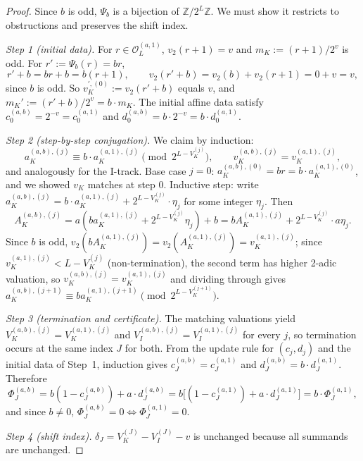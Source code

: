 \documentclass[11pt,reqno]{amsart}
\theoremstyle{plain}
\theoremstyle{definition}
\theoremstyle{remark}
\newcommand{\Z}{\mathbb{Z}}
\newcommand{\Obs}{\mathcal{O}}
\newcommand{\Vk}{V_{K}}
\newcommand{\Vi}{V_{I}}
\newcommand{\vtwo}{v_{2}}
\newcommand{\Psib}{\Psi_{b}}
\begin{document}
\begin{proof}
Since $b$ is odd, $\Psib$ is a bijection of $\Z/2^L\Z$. We must show it
restricts to obstructions and preserves the shift index.

\emph{Step 1 (initial data).} For $r \in \Obs_L^{(a,1)}$,
$\vtwo(r+1) = v$ and $m_K := (r+1)/2^v$ is odd. For $r' := \Psib(r) = br$,
\[
r' + b = br + b = b(r+1), \qquad \vtwo(r'+b) = \vtwo(b) + \vtwo(r+1) = 0 + v = v,
\]
since $b$ is odd. So $v_K^{\prime,(0)} := \vtwo(r' + b)$ equals $v$, and
$m_K' := (r'+b)/2^v = b \cdot m_K$. The initial affine data satisfy
$c_0^{(a,b)} = 2^{-v} = c_0^{(a,1)}$ and
$d_0^{(a,b)} = b \cdot 2^{-v} = b \cdot d_0^{(a,1)}$.

\emph{Step 2 (step-by-step conjugation).} We claim by induction:
\begin{equation}\label{eq:conj-induction}
a_K^{(a,b),(j)} \equiv b \cdot a_K^{(a,1),(j)} \pmod{2^{L - \Vk^{(j)}}},
\qquad
v_K^{(a,b),(j)} = v_K^{(a,1),(j)},
\end{equation}
and analogously for the I-track. Base case $j = 0$: $a_K^{(a,b),(0)} = b r
= b \cdot a_K^{(a,1),(0)}$, and we showed $v_K$ matches at step $0$.
Inductive step: write $a_K^{(a,b),(j)} = b \cdot a_K^{(a,1),(j)} + 2^{L -
\Vk^{(j)}} \cdot \eta_j$ for some integer $\eta_j$. Then
\[
A_K^{(a,b),(j)} = a (b a_K^{(a,1),(j)} + 2^{L - \Vk^{(j)}} \eta_j) + b
                = b A_K^{(a,1),(j)} + 2^{L - \Vk^{(j)}} \cdot a \eta_j.
\]
Since $b$ is odd, $\vtwo(b A_K^{(a,1),(j)}) = \vtwo(A_K^{(a,1),(j)}) =
v_K^{(a,1),(j)}$; since $v_K^{(a,1),(j)} < L - \Vk^{(j)}$
(non-termination), the second term has higher 2-adic valuation, so
$v_K^{(a,b),(j)} = v_K^{(a,1),(j)}$ and dividing through gives
$a_K^{(a,b),(j+1)} \equiv b a_K^{(a,1),(j+1)} \pmod{2^{L - \Vk^{(j+1)}}}$.

\emph{Step 3 (termination and certificate).} The matching valuations
yield $\Vk^{(a,b),(j)} = \Vk^{(a,1),(j)}$ and
$\Vi^{(a,b),(j)} = \Vi^{(a,1),(j)}$ for every $j$, so termination
occurs at the same index $J$ for both. From the update rule for $(c_j,
d_j)$ and the initial data of Step~1, induction gives
$c_J^{(a,b)} = c_J^{(a,1)}$ and $d_J^{(a,b)} = b \cdot d_J^{(a,1)}$.
Therefore
\[
\Phi_J^{(a,b)} = b(1 - c_J^{(a,b)}) + a \cdot d_J^{(a,b)}
              = b \bigl[(1 - c_J^{(a,1)}) + a \cdot d_J^{(a,1)}\bigr]
              = b \cdot \Phi_J^{(a,1)},
\]
and since $b \ne 0$, $\Phi_J^{(a,b)} = 0 \iff \Phi_J^{(a,1)} = 0$.

\emph{Step 4 (shift index).} $\delta_J = \Vk^{(J)} - \Vi^{(J)} - v$
is unchanged because all summands are unchanged. \qedhere
\end{proof}
\end{document}
